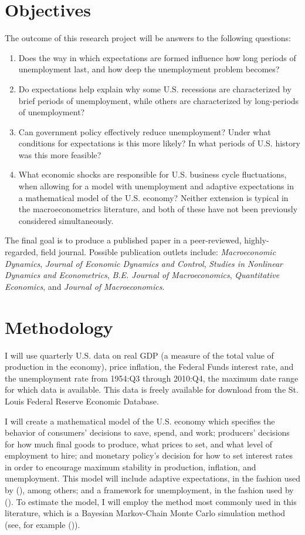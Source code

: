 \documentclass[11pt]{article}
\newcommand{\be}{
  \begin{enumerate}
  \setlength{\itemsep}{0pt}
  \setlength{\parskip}{0pt}
}
\newcommand{\ee}{\end{enumerate}}
\newcommand{\citee}[1]{\citename{#1} (\citeyear{#1})}
\begin{document}
\section{Objectives}
The outcome of this research project will be answers to the following questions:
\be
\item Does the way in which expectations are formed influence how long periods of unemployment last, and how deep the unemployment problem becomes?
\item Do expectations help explain why some U.S. recessions are characterized by brief periods of unemployment, while others are characterized by long-periods of unemployment?
\item Can government policy effectively reduce unemployment?  Under what conditions for expectations is this more likely?  In what periods of U.S. history was this more feasible?
\item What economic shocks are responsible for U.S. business cycle fluctuations, when allowing for a model with unemployment and adaptive expectations in a mathematical model of the U.S. economy?  Neither extension is typical in the macroeconometrics literature, and both of these have not been previously considered simultaneously.
\ee

The final goal is to produce a published paper in a peer-reviewed, highly-regarded, field journal.  Possible publication outlets include: \textit{Macroeconomic Dynamics}, \textit{Journal of Economic Dynamics and Control}, \textit{Studies in Nonlinear Dynamics and Econometrics}, \textit{B.E. Journal of Macroeconomics}, \textit{Quantitative Economics}, and \textit{Journal of Macroeconomics}.

\section{Methodology}
I will use quarterly U.S. data on real GDP (a measure of the total value of production in the economy), price inflation, the Federal Funds interest rate, and the unemployment rate from 1954:Q3 through 2010:Q4, the maximum date range for which data is available.  This data is freely available for download from the St. Louis Federal Reserve Economic Database.  

I will create a mathematical model of the U.S. economy which specifies the behavior of consumers' decisions to save, spend, and work; producers' decisions for how much final goods to produce, what prices to set, and what level of employment to hire; and monetary policy's decision for how to set interest rates in order to encourage maximum stability in production, inflation, and unemployment.  This model will include adaptive expectations, in the fashion used by \citee{eusepi_preston_2011}, among others; and a framework for unemployment, in the fashion used by \citee{blanchard_gali2010}.  To estimate the model, I will employ the method most commonly used in this literature, which is a Bayesian Markov-Chain Monte Carlo simulation method (see, for example \citee{smetswouters2007}).
\end{document}
